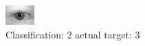 \begin{figure}[h!]
\begin{center}
\includegraphics[width=0.60\columnwidth]{figures/ID521_class_2_target_3.png}
\end{center}
\caption{ Classification: 2 actual target: 3}
\label{fig:ID521_class_2_target_3}
\end{figure}
